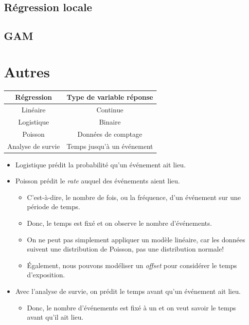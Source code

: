 \documentclass[french]{article}
\begin{document}
\begin{multicols*}{2}
\columnbreak
\subsection{Régression locale}



\columnbreak
\subsection{GAM}






\newpage
\section{Autres}
\begin{tabular}{|	c	|	c	|}
Régression	&	Type de variable réponse	\\\hline
Linéaire		&	Continue	\\
Logistique	&	Binaire	\\
Poisson		&	Données de comptage	\\
Analyse de survie	&	Temps jusqu'à un événement	\\
\end{tabular}
\begin{itemize}
	\item	Logistique prédit la probabilité qu'un événement ait lieu.
	\item	Poisson prédit le \og \textit{rate} \fg{} auquel des événements aient lieu.
		\begin{itemize}
		\item	C'est-à-dire, le nombre de fois, ou la fréquence, d'un événement sur une période de temps.
		\item	Donc, le temps est fixé et on observe le nombre d'événements.
		\item	On ne peut pas simplement appliquer un modèle linéaire, car les données suivent une distribution de Poisson, pas une distribution normale! 
		\item	Également, nous pouvons modéliser un \og \textit{offset} \fg{} pour considérer le temps d'exposition.
		\end{itemize}
	\item	Avec l'analyse de survie, on prédit le temps avant qu'un événement ait lieu.
		\begin{itemize}
		\item	Donc, le nombre d'événements est fixé à un et on veut savoir le temps avant qu'il ait lieu.
		\end{itemize}
\end{itemize}


\end{multicols*}
\end{document}
